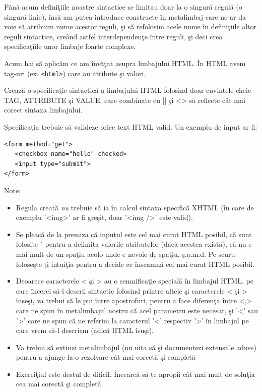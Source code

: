 Până acum definiţiile noastre sintactice se limitau doar la
o singură regulă (o singură linie), însă am putea introduce
constructe în metalimbaj care ne-ar da voie să atribuim nume
acestor reguli, şi să refolosim acele nume în definiţiile altor
reguli sintactice, creând astfel interdependenţe între reguli,
şi deci crea specificaţiile unor limbaje foarte complexe.


\begin{Exercise}[title={Sintaxa HTML},label={ex:sintaxa_html},difficulty=3]
Acum hai să aplicăm ce am învăţat asupra limbajului HTML. În HTML avem
tag-uri (ex. \texttt{<html>}) care au atribute şi valori.

\Question Crează o specificaţie sintactică a limbajului HTML folosind
doar cuvintele cheie TAG, ATTRIBUTE şi VALUE, care combinate
cu [] şi <> să reflecte cât mai corect sintaxa limbajului.

Specificaţia trebuie să valideze orice text HTML valid.
Un exemplu de input ar fi:
\begin{verbatim}
<form method="get">
   <checkbox name="hello" checked>
   <input type="submit">
</form>
\end{verbatim}
\ExeText
Note:
\begin{itemize}
\item Regula creată \textit{nu} trebuie să ia în calcul sintaxa
specifică XHTML (în care de exemplu '<img>' ar fi greşit, doar '<img />' este valid).
\item Se pleacă de la premiza că inputul este cel mai curat HTML posibil, că
sunt folosite " pentru a delimita valorile atributelor (dacă acestea există), că
nu e mai mult de un spaţiu acolo unde e nevoie de spaţiu, ş.a.m.d. Pe scurt:
foloseşte-ţi intuiţia pentru a decide ce înseamnă {\glqq}cel mai curat HTML posibil{\grqq}.
\item Deoarece caracterele < şi > au o semnificaţie specială în limbajul HTML, pe
care încerci să-l descrii sintactic folosind printre altele
şi caracterele < şi > înseşi, va trebui să le pui între apostrofuri, pentru a face
diferenţa între <,> care ne spun în metalimbajul nostru
că acel parametru este necesar, şi '<' sau '>' care
ne spun că ne referim la caracterul '<' respectiv '>' în limbajul pe care
vrem să-l descriem (adică HTML îsuşi).
\item Va trebui să extinzi metalimbajul (nu uita să şi documentezi extensiile aduse)
pentru a ajunge la o rezolvare cât mai corectă şi completă
\item Exerciţiul este destul de dificil. Încearcă să te apropii cât mai mult de soluţia
cea mai corectă şi completă.
\end{itemize}
\end{Exercise}


